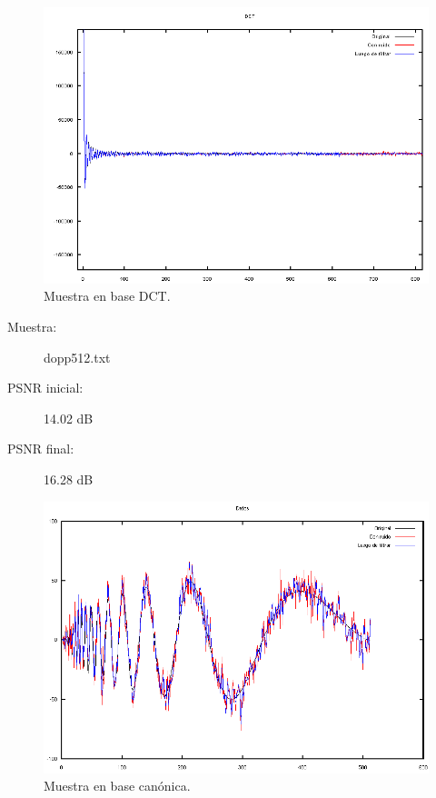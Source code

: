 \documentclass[a4paper,10pt,twoside]{article}
\begin{document}
\begin{figure}[H]
  \centering
  \includegraphics[width=15cm]{graficos/ramp_aditivo_atenuar_dct.png} 
  \caption{Muestra en base DCT.}
\end{figure}


\begin{description}
  \item[Muestra:] dopp512.txt
  \item[PSNR inicial:] 14.02 dB
  \item[PSNR final:] 16.28 dB
\end{description}

\begin{figure}[H]
  \centering
  \includegraphics[width=15cm]{graficos/dopp_aditivo_atenuar_muestra.png}
  \caption{Muestra en base canónica.}
\end{figure}
\end{document}
